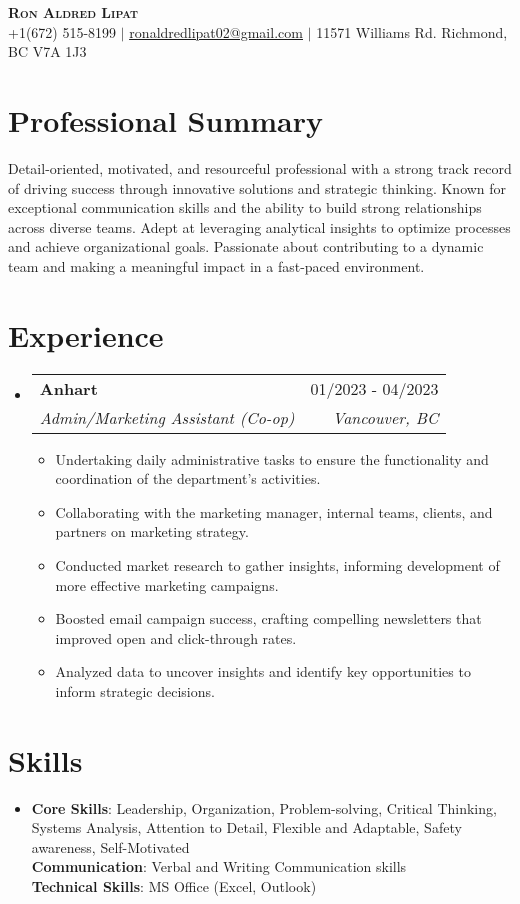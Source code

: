 \documentclass[letterpaper,11pt]{article}
\makeatletter
\newcommand{\resumeItem}[1]{
\item\small{
{#1 \vspace{-2pt}}
}
}
\newcommand{\resumeSubheading}[4]{
\vspace{-2pt}\item
\begin{tabular*}{0.97\textwidth}[t]{l@{\extracolsep{\fill}}r}
\textbf{#1} & #2 \\
\textit{\small#3} & \textit{\small #4} \\
\end{tabular*}\vspace{-7pt}
}
\newcommand{\resumeSubHeadingListStart}{\begin{itemize}[leftmargin=0.15in, label={}]}
\newcommand{\resumeSubHeadingListEnd}{\end{itemize}}
\newcommand{\resumeItemListStart}{\begin{itemize}}
\newcommand{\resumeItemListEnd}{\end{itemize}\vspace{-5pt}}
\makeatother
\begin{document}
\begin{center}
\textbf{\Huge \scshape Ron Aldred Lipat} \\ \vspace{1pt}
\small +1(672) 515-8199 $|$ \href{mailto:ronaldredlipat02@gmail.com}{\underline{ronaldredlipat02@gmail.com}} $|$
11571 Williams Rd. Richmond, BC V7A 1J3
\end{center}


\section{Professional Summary} %
Detail-oriented, motivated, and resourceful professional with a strong track record of driving success through innovative solutions and strategic thinking. Known for exceptional communication skills and the ability to build strong relationships across diverse teams. Adept at leveraging analytical insights to optimize processes and achieve organizational goals. Passionate about contributing to a dynamic team and making a meaningful impact in a fast-paced environment.

\section{Experience}
\resumeSubHeadingListStart
\resumeSubheading{Anhart}{01/2023 - 04/2023}{Admin/Marketing Assistant (Co-op)}{Vancouver, BC}
\resumeItemListStart
\resumeItem{Undertaking daily administrative tasks to ensure the functionality and coordination of the department's activities.}
\resumeItem{Collaborating with the marketing manager, internal teams, clients, and partners on marketing strategy.}
\resumeItem{Conducted market research to gather insights, informing development of more effective marketing campaigns.}
\resumeItem{Boosted email campaign success, crafting compelling newsletters that improved open and click-through rates.}
\resumeItem{Analyzed data to uncover insights and identify key opportunities to inform strategic decisions.}
\resumeItemListEnd
\resumeSubHeadingListEnd

\section{Skills}
\begin{itemize}[leftmargin=0.15in, label={}]
\item{
\textbf{Core Skills}{: Leadership, Organization, Problem-solving, Critical Thinking, Systems Analysis, Attention to Detail, Flexible and Adaptable, Safety awareness, Self-Motivated} \\
\textbf{Communication}{: Verbal and Writing Communication skills} \\
\textbf{Technical Skills}{: MS Office (Excel, Outlook)}
} \\
\end{itemize}
\end{document}
